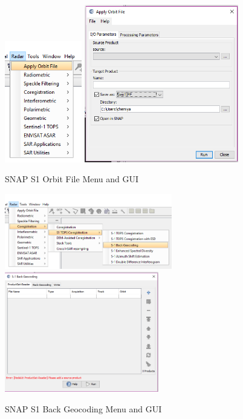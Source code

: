 \documentclass[a4paper,11.5pt,onecolumn]{article}
\begin{document}
\begin{figure}[htbp]
\begin{center}
\includegraphics[width=0.3\textwidth]{images/SNAP_S1_Apply_Orbit_File}
\includegraphics[width=0.6\textwidth]{images/SNAP_S1_Apply_Orbit_File_GUI}
\end{center}
\caption{SNAP S1 Orbit File Menu and GUI}
\label{fig9}
\end{figure}

\begin{figure}[htbp]
\begin{center}
\includegraphics[width=0.65\textwidth]{images/SNAP_S1_Back_Geocoding}
\includegraphics[width=0.6\textwidth]{images/SNAP_S1_Back_Geocoding_GUI}
\end{center}
\caption{SNAP S1 Back Geocoding Menu and GUI}
\label{fig10}
\end{figure}
\end{document}
